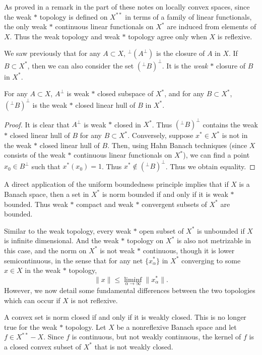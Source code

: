 As proved in a remark in the part of these notes on locally convex spaces, since the weak $*$ topology is defined on $X^{**}$ in terms of a family of linear functionals, the only weak $*$ continuous linear functionals on $X^*$ are induced from elements of $X$. Thus the weak topology and weak $*$ topology agree only when $X$ is reflexive.

We saw previously that for any $A \subset X$, ${}^{\perp} (A^\perp)$ is the closure of $A$ in $X$. If $B \subset X^*$, then we can also consider the set $({}^\perp B)^\perp$. It is the \emph{weak $*$} closure of $B$ in $X^*$.

\begin{theorem}
    For any $A \subset X$, $A^\perp$ is weak $*$ closed subspace of $X^*$, and for any $B \subset X^*$, $({}^\perp B)^\perp$ is the weak $*$ closed linear hull of $B$ in $X^*$.
\end{theorem}
\begin{proof}
    It is clear that $A^\perp$ is weak $*$ closed in $X^*$. Thus $({}^\perp B)^\perp$ contains the weak $*$ closed linear hull of $B$ for any $B \subset X^*$. Conversely, suppose $x^* \in X^*$ is not in the weak $*$ closed linear hull of $B$. Then, using Hahn Banach techniques (since $X$ consists of the weak $*$ continuous linear functionals on $X^*$), we can find a point $x_0 \in B^\perp$ such that $x^*(x_0) = 1$. Thus $x^* \not \in ({}^\perp B)^\perp$. Thus we obtain equality.
\end{proof}

A direct application of the uniform boundedness principle implies that if $X$ is a Banach space, then a set in $X^*$ is norm bounded if and only if it is weak $*$ bounded. Thus weak $*$ compact and weak $*$ convergent subsets of $X^*$ are bounded.

Similar to the weak topology, every weak $*$ open subset of $X^*$ is unbounded if $X$ is infinite dimensional. And the weak $*$ topology on $X^*$ is also not metrizable in this case, and the norm on $X^*$ is not weak $*$ continuous, though it is lower semicontinuous, in the sense that for any net $\{ x_\alpha^* \}$ in $X^*$ converging to some $x \in X$ in the weak $*$ topology,
%
\[ \| x \| \leq \liminf_{\alpha \to \infty} \| x_\alpha^* \|. \]
%
However, we now detail some fundamental differences between the two topologies which can occur if $X$ is not reflexive.

\begin{example}
    A convex set is norm closed if and only if it is weakly closed. This is no longer true for the weak $*$ topology. Let $X$ be a nonreflexive Banach space and let $f \in X^{**} - X$. Since $f$ is continuous, but not weakly continuous, the kernel of $f$ is a closed convex subset of $X^*$ that is not weakly closed.
\end{example}


